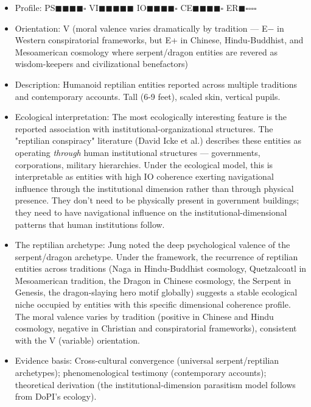 \begin{itemize}[nosep,leftmargin=*]
  \item Profile: PS$\blacksquare$$\blacksquare$$\blacksquare$$\blacksquare$$\square$ VI$\blacksquare$$\blacksquare$$\blacksquare$$\blacksquare$$\blacksquare$ IO$\blacksquare$$\blacksquare$$\blacksquare$$\blacksquare$$\square$ CE$\blacksquare$$\blacksquare$$\blacksquare$$\blacksquare$$\square$ ER$\blacksquare$$\square$$\square$$\square$$\square$
  \item Orientation: V (moral valence varies dramatically by tradition — E− in Western conspiratorial frameworks, but E+ in Chinese, Hindu-Buddhist, and Mesoamerican cosmology where serpent/\allowbreak dragon entities are revered as wisdom-keepers and civilizational benefactors)
  \item Description: Humanoid reptilian entities reported across multiple traditions and contemporary accounts. Tall (6-9 feet), scaled skin, vertical pupils.
  \item Ecological interpretation: The most ecologically interesting feature is the reported association with institutional-organizational structures. The "reptilian conspiracy" literature (David Icke et al.) describes these entities as operating \textit{through} human institutional structures — governments, corporations, military hierarchies. Under the ecological model, this is interpretable as entities with high IO coherence exerting navigational influence through the institutional dimension rather than through physical presence. They don't need to be physically present in government buildings; they need to have navigational influence on the institutional-dimensional patterns that human institutions follow.
  \item The reptilian archetype: Jung noted the deep psychological valence of the serpent/\allowbreak dragon archetype. Under the framework, the recurrence of reptilian entities across traditions (Naga in Hindu-Buddhist cosmology, Quetzalcoatl in Mesoamerican tradition, the Dragon in Chinese cosmology, the Serpent in Genesis, the dragon-slaying hero motif globally) suggests a stable ecological niche occupied by entities with this specific dimensional coherence profile. The moral valence varies by tradition (positive in Chinese and Hindu cosmology, negative in Christian and conspiratorial frameworks), consistent with the V (variable) orientation.
  \item Evidence basis: Cross-cultural convergence (universal serpent/\allowbreak reptilian archetypes); phenomenological testimony (contemporary accounts); theoretical derivation (the institutional-dimension parasitism model follows from DoPI's ecology).
\end{itemize}


